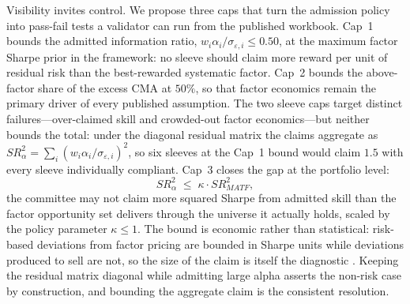 \documentclass[pdftex,12pt,a4paper]{article}
\begin{document}
Visibility invites control. We propose three caps that turn the admission policy into pass-fail tests a validator can run from the published workbook. Cap~1 bounds the admitted information ratio, $w_i \alpha_i / \sigma_{\varepsilon,i} \le 0.50$, at the maximum factor Sharpe prior in the framework: no sleeve should claim more reward per unit of residual risk than the best-rewarded systematic factor. Cap~2 bounds the above-factor share of the excess CMA at $50\%$, so that factor economics remain the primary driver of every published assumption. The two sleeve caps target distinct failures---over-claimed skill and crowded-out factor economics---but neither bounds the total: under the diagonal residual matrix the claims aggregate as $SR^2_{\alpha} = \sum_i (w_i \alpha_i / \sigma_{\varepsilon,i})^2$, so six sleeves at the Cap~1 bound would claim $1.5$ with every sleeve individually compliant. Cap~3 closes the gap at the portfolio level:
\begin{equation}\label{eq:cap3}
	SR^2_{\alpha} \;\le\; \kappa \cdot SR^2_{MATF},
\end{equation}
the committee may not claim more squared Sharpe from admitted skill than the factor opportunity set delivers through the universe it actually holds, scaled by the policy parameter $\kappa \le 1$. The bound is economic rather than statistical: risk-based deviations from factor pricing are bounded in Sharpe units while deviations produced to sell are not, so the size of the claim is itself the diagnostic \citep{SeppKastenholzFAJ2026}. Keeping the residual matrix diagonal while admitting large alpha asserts the non-risk case by construction, and bounding the aggregate claim is the consistent resolution.
\end{document}
